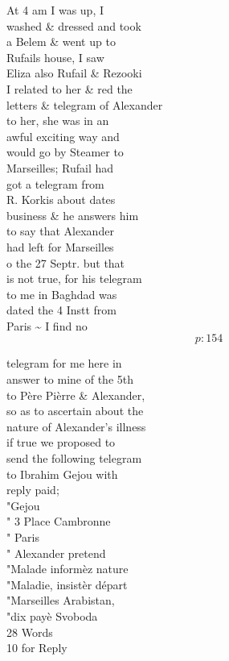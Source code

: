 \documentclass{report}
\begin{document}
	\par{
 	At 4 am I was up, I\ \\washed \& dressed and took\ \\a Belem \& went up to\ \\Rufails house, I saw\ \\Eliza also Rufail \& Rezooki\ \\I related to her \& red the\ \\letters \& telegram of Alexander\ \\to her, she was in an\ \\awful exciting way and\ \\would go by Steamer to\ \\Marseilles; Rufail had\ \\got a telegram from\ \\R. Korkis about dates\ \\business \& he answers him\ \\to say that Alexander\ \\had left for Marseilles\ \\o the 27 Septr. but that\ \\is not true, for his telegram\ \\to me in Baghdad was\ \\dated the 4 Instt from\ \\Paris \~{} I find no\ \\
  \[p: 154 \]

	}


	\par{
 	telegram for me here in\ \\answer to mine of the 5th\ \\to Père Pièrre \& Alexander,\ \\so as to ascertain about the\ \\nature of Alexander's illness\ \\if true we proposed to\ \\send the following telegram\ \\to Ibrahim Gejou with\ \\reply paid;\ \\"Gejou\ \\" 3 Place Cambronne\ \\" Paris\ \\" Alexander pretend\ \\"Malade informèz nature\ \\"Maladie, insistèr départ\ \\"Marseilles Arabistan,\ \\"dix payè Svoboda\ \\28 Words\ \\10 for Reply\ \\
	}
\end{document}

